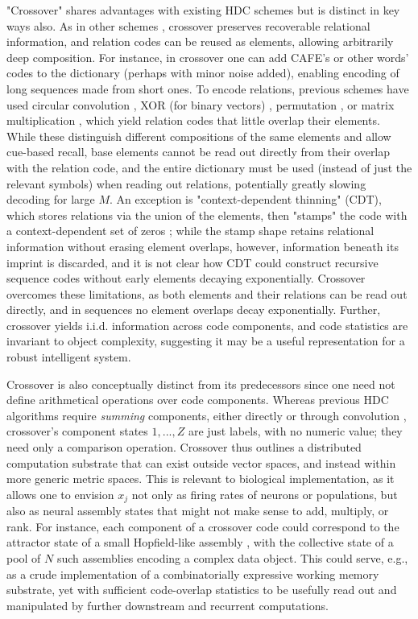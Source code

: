 \documentclass{article}
\begin{document}
"Crossover" shares advantages with existing HDC schemes but is distinct in key ways also. As in other schemes \cite{Kanerva:2009}, crossover preserves recoverable relational information, and relation codes can be reused as elements, allowing arbitrarily deep composition. For instance, in crossover one can add CAFE's or other words' codes to the dictionary (perhaps with minor noise added), enabling encoding of long sequences made from short ones. To encode relations, previous schemes have used circular convolution \cite{Plate:1995}, XOR (for binary vectors) \cite{Kanerva:1994}, permutation \cite{Sahlgren:2008, Gayler:1998}, or matrix multiplication \cite{Gosmann:2019}, which yield relation codes that little overlap their elements. While these distinguish different compositions of the same elements and allow cue-based recall, base elements cannot be read out directly from their overlap with the relation code, and the entire dictionary must be used (instead of just the relevant symbols) when reading out relations, potentially greatly slowing decoding for large $M$. An exception is "context-dependent thinning" (CDT), which stores relations via the union of the elements, then "stamps" the code with a context-dependent set of zeros \cite{Rachkovskij:2001}; while the stamp shape retains relational information without erasing element overlaps, however, information beneath its imprint is discarded, and it is not clear how CDT could construct recursive sequence codes without early elements decaying exponentially. Crossover overcomes these limitations, as both elements and their relations can be read out directly, and in sequences no element overlaps decay exponentially. Further, crossover yields i.i.d. information across code components, and code statistics are invariant to object complexity, suggesting it may be a useful representation for a robust intelligent system.

Crossover is also conceptually distinct from its predecessors since one need not define arithmetical operations over code components. Whereas previous HDC algorithms require \textit{summing} components, either directly or through convolution \cite{Plate:1995, Gayler:1998, Sahlgren:2008, Gosmann:2019, Rachkovskij:2001, Kanerva:1994}, crossover's component states $1, ..., Z$ are just labels, with no numeric value; they need only a comparison operation. Crossover thus outlines a distributed computation substrate that can exist outside vector spaces, and instead within more generic metric spaces. This is relevant to biological implementation, as it allows one to envision $x_j$ not only as firing rates of neurons or populations, but also as neural assembly states that might not make sense to add, multiply, or rank. For instance, each component of a crossover code could correspond to the attractor state of a small Hopfield-like assembly \cite{Hopfield:1982}, with the collective state of a pool of $N$ such assemblies encoding a complex data object. This could serve, e.g., as a crude implementation of a combinatorially expressive working memory substrate, yet with sufficient code-overlap statistics to be usefully read out and manipulated by further downstream and recurrent computations.
\end{document}
